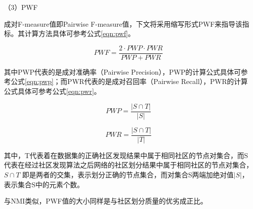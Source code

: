 


（3）PWF

成对F-measure值即Pairwise F-measure值，下文将采用缩写形式PWF来指导该指标。其计算方法具体可参考公式\ref{eqn:pwf}。

\begin{equation}
  \label{eqn:pwf}
  PWF=\frac{2\cdot PWP\cdot PWR}{PWP+PWR}
\end{equation}

其中PWP代表的是成对准确率（Pairwise Precision），PWP的计算公式具体可参考公式\ref{eqn:pwp}；而PWR代表的是成对召回率（Pairwise Recall），PWR的计算公式具体可参考公式\ref{eqn:pwr}。

\begin{equation}
  \label{eqn:pwp}
  PWP=\frac{ \left | S \cap T \right |}{ \left | S \right |}
\end{equation}

\begin{equation}
  \label{eqn:pwr}
  PWR=\frac{ \left | S \cap T \right |}{ \left | T \right |}
\end{equation}

其中，T代表着在数据集的正确社区发现结果中属于相同社区的节点对集合，而S代表在经过社区发现算法之后网络的社区划分结果中属于相同社区的节点对集合，$S \cap T $ 即是两者的交集，表示划分正确的节点集合，而对集合S两端加绝对值$\left | S \right |$，表示集合S中的元素个数。

与NMI类似，PWF值的大小同样是与社区划分质量的优劣成正比。

